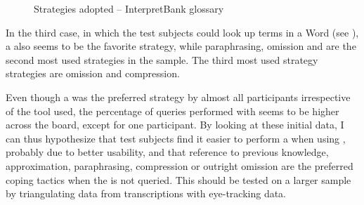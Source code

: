 \documentclass[output=paper]{langsci/langscibook}
\begin{document}
\begin{figure}[p]
\caption{Strategies adopted -- InterpretBank glossary} 
\label{fig:prandi:17}
\end{figure}

In the third case, in which the test subjects could look up terms in a Word  (see ), a  also seems to be the favorite strategy, while paraphrasing, omission and  are the second most used strategies in the sample. The third most used strategy strategies are omission and compression. 


Even though a  was the preferred strategy by almost all participants irrespective of the tool used, the percentage of queries performed with  seems to be higher across the board, except for one participant. By looking at these initial data, I can thus hypothesize that test subjects find it easier to perform a  when using , probably due to better usability, and that reference to previous knowledge, approximation, paraphrasing, compression or outright omission are the preferred coping tactics when the  is not queried. This should be tested on a larger sample by triangulating data from transcriptions with eye-tracking data. 
\end{document}
